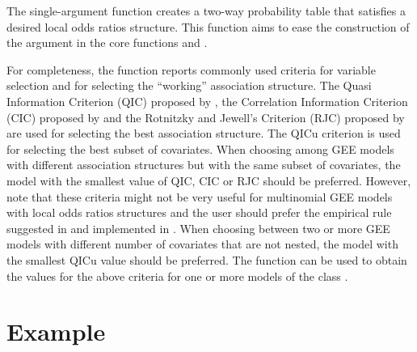 \documentclass[
]{jss}
\begin{document}
The single-argument function  creates a two-way
probability table that satisfies a desired local odds ratios structure.
This function aims to ease the construction of the 
argument in the core functions  and .

For completeness, the function  reports commonly used
criteria for variable selection and for selecting the ``working''
association structure. The Quasi Information Criterion (QIC) proposed by
\citet{pan2001b}, the Correlation Information Criterion (CIC) proposed
by \citet{hin2009} and the Rotnitzky and Jewell's Criterion (RJC)
proposed by \citet{rotnitzky1990} are used for selecting the best
association structure. The QICu criterion \citep{pan2001b} is used for
selecting the best subset of covariates. When choosing among GEE models
with different association structures but with the same subset of
covariates, the model with the smallest value of QIC, CIC or RJC should
be preferred. However, note that these criteria might not be very useful
for multinomial GEE models with local odds ratios structures and the
user should prefer the empirical rule suggested in \citet{Touloumis2012}
and implemented in . When choosing between two or
more GEE models with different number of covariates that are not nested,
the model with the smallest QICu value should be preferred. The function
 can be used to obtain the values for the above
criteria for one or more models of the class .

\hypertarget{Example}{%
\section{Example}\label{Example}}
\end{document}
